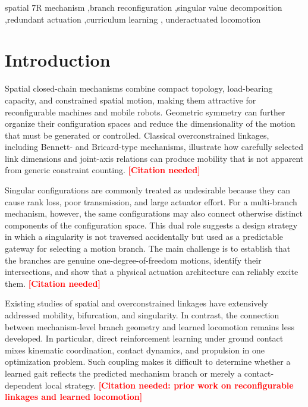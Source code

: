 \documentclass[a4paper,fleqn]{cas-sc}
\newcommand{\missing}[1]{\textcolor{red}{\textbf{[#1]}}}
\begin{document}
\begin{keywords}
spatial 7R mechanism \sep branch reconfiguration \sep singular value
decomposition \sep redundant actuation \sep curriculum learning \sep
underactuated locomotion
\end{keywords}

\maketitle

\section{Introduction}

Spatial closed-chain mechanisms combine compact topology, load-bearing
capacity, and constrained spatial motion, making them attractive for
reconfigurable machines and mobile robots. Geometric symmetry can further
organize their configuration spaces and reduce the dimensionality of the
motion that must be generated or controlled. Classical overconstrained
linkages, including Bennett- and Bricard-type mechanisms, illustrate how
carefully selected link dimensions and joint-axis relations can produce
mobility that is not apparent from generic constraint counting.
\missing{Citation needed}

Singular configurations are commonly treated as undesirable because they can
cause rank loss, poor transmission, and large actuator effort. For a
multi-branch mechanism, however, the same configurations may also connect
otherwise distinct components of the configuration space. This dual role
suggests a design strategy in which a singularity is not traversed
accidentally but used as a predictable gateway for selecting a motion branch.
The main challenge is to establish that the branches are genuine
one-degree-of-freedom motions, identify their intersections, and show that a
physical actuation architecture can reliably excite them.
\missing{Citation needed}

Existing studies of spatial and overconstrained linkages have extensively
addressed mobility, bifurcation, and singularity. In contrast, the connection
between mechanism-level branch geometry and learned locomotion remains less
developed. In particular, direct reinforcement learning under ground contact
mixes kinematic coordination, contact dynamics, and propulsion in one
optimization problem. Such coupling makes it difficult to determine whether a
learned gait reflects the predicted mechanism branch or merely a
contact-dependent local strategy.
\missing{Citation needed: prior work on reconfigurable linkages and learned locomotion}
\end{document}
